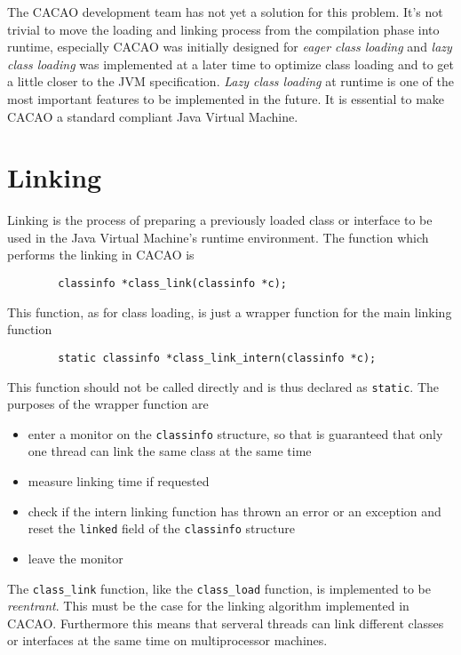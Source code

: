 The CACAO development team has not yet a solution for this
problem. It's not trivial to move the loading and linking process from
the compilation phase into runtime, especially CACAO was initially
designed for \textit{eager class loading} and \textit{lazy class
loading} was implemented at a later time to optimize class loading and
to get a little closer to the JVM specification. \textit{Lazy class
loading} at runtime is one of the most important features to be
implemented in the future. It is essential to make CACAO a standard
compliant Java Virtual Machine.


\section{Linking}
\label{sectionlinking}

Linking is the process of preparing a previously loaded class or
interface to be used in the Java Virtual Machine's runtime
environment. The function which performs the linking in CACAO is

\begin{verbatim}
        classinfo *class_link(classinfo *c);
\end{verbatim}

This function, as for class loading, is just a wrapper function for
the main linking function

\begin{verbatim}
        static classinfo *class_link_intern(classinfo *c);
\end{verbatim}

This function should not be called directly and is thus declared as
\texttt{static}. The purposes of the wrapper function are

\begin{itemize}
 \item enter a monitor on the \texttt{classinfo} structure, so that is
 guaranteed that only one thread can link the same class at the same
 time

 \item measure linking time if requested

 \item check if the intern linking function has thrown an error or an
 exception and reset the \texttt{linked} field of the
 \texttt{classinfo} structure

 \item leave the monitor
\end{itemize}

The \texttt{class\_link} function, like the \texttt{class\_load}
function, is implemented to be \textit{reentrant}. This must be the
case for the linking algorithm implemented in CACAO. Furthermore this
means that serveral threads can link different classes or interfaces
at the same time on multiprocessor machines.

